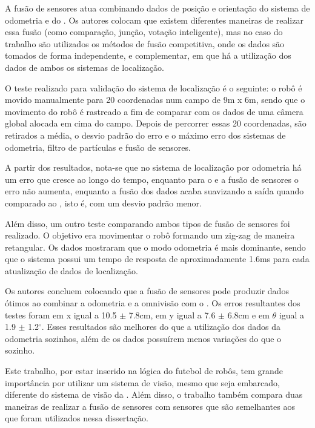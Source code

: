 \documentclass[acronym, symbols, table, deposito]{fei}
\begin{document}
A fusão de sensores atua combinando dados de posição e orientação do sistema de odometria e do . Os autores colocam que existem diferentes maneiras de realizar essa fusão (como comparação, junção, votação inteligente), mas no caso do trabalho são utilizados os métodos de fusão competitiva, onde os dados são tomados de forma independente, e complementar, em que há a utilização dos dados de ambos os sistemas de localização.

O teste realizado para validação do sistema de localização é o seguinte: o robô é movido manualmente para 20 coordenadas num campo de 9m x 6m, sendo que o movimento do robô é rastreado a fim de comparar com os dados de uma câmera global alocada em cima do campo. Depois de percorrer essas 20 coordenadas, são retirados a média, o desvio padrão do erro e o máximo erro dos sistemas de odometria, filtro de partículas e fusão de sensores.

A partir dos resultados, nota-se que no sistema de localização por odometria há um erro que cresce ao longo do tempo, enquanto para o  e a fusão de sensores o erro não aumenta, enquanto a fusão dos dados acaba suavizando a saída quando comparado ao , isto é, com um desvio padrão menor.

Além disso, um outro teste comparando ambos tipos de fusão de sensores foi realizado. O objetivo era movimentar o robô formando um zig-zag de maneira retangular. Os dados mostraram que o modo odometria é mais dominante, sendo que o sistema possui um tempo de resposta de aproximadamente 1.6ms para cada atualização de dados de localização.

Os autores concluem colocando que a fusão de sensores pode produzir dados ótimos ao combinar a odometria e a omnivisão com o . Os erros resultantes dos testes foram em x igual a 10.5 $\pm$ 7.8cm, em y igual a 7.6 $\pm$ 6.8cm e em $\theta$ igual a 1.9 $\pm$ 1.2$^\circ$. Esses resultados são melhores do que a utilização dos dados da odometria sozinhos, além de os dados possuírem menos variações do que o  sozinho.

Este trabalho, por estar inserido na lógica do futebol de robôs, tem grande importância por utilizar um sistema de visão, mesmo que seja embarcado, diferente do sistema de visão da . Além disso, o trabalho também compara duas maneiras de realizar a fusão de sensores com sensores que são semelhantes aos que foram utilizados nessa dissertação.

\end{document}
